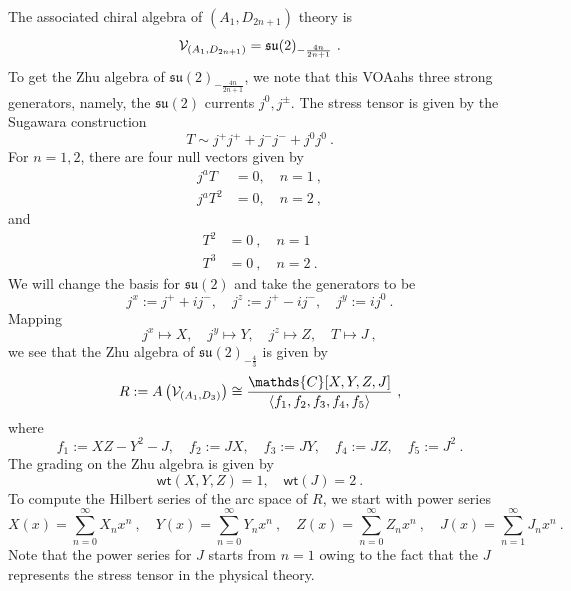 \documentclass[a4paper,10pt]{article}
\newcommand{\C}{\mathds{C}}
\newcommand{\mr}[1]{\mathsf{#1}}
\newcommand{\tsf}[1]{\textsf{#1}}
\newcommand{\mf}[1]{\mathfrak{#1}}
\def\CV {{\cal V}}
\begin{document}
The associated chiral algebra of $(A_1,D_{2n+1})$ theory is \cite{beem2014infinite,Beem:2017ooy} 
\begin{equation}
    \CV_{(A_1,D_{2n+1})}=\mf{su}(2)_{-\frac{4n}{2n+1}}~.
\end{equation}
To get the Zhu algebra of $\mf{su}(2)_{-\frac{4n}{2n+1}}$, we note that this \tsf{VOA}ahs three strong generators, namely, the $\mf{su}(2)$ currents $j^0,j^\pm$. The stress tensor is given by the Sugawara construction 
\begin{equation}
    T\sim j^+j^++j^-j^-+j^0j^0~.
\end{equation}
For $n=1,2$, there are four null vectors \cite{Beem:2017ooy} given by 
\begin{align}
j^aT&=0,\quad n=1~,
\\
j^aT^2&=0,\quad n=2~,
\end{align}
and 
\begin{align}
T^2&=0~,\quad n=1
\\
T^3&=0~,\quad n=2~.
\end{align}
We will change the basis for $\mf{su}(2)$ and take the generators to be 
\begin{equation}\label{eq:basis_change_su(2)}
    j^x:=j^++ij^-,\quad j^z:=j^+-ij^-,\quad j^y:=ij^0~.
\end{equation}
Mapping 
\begin{equation}\label{eq:var_su(2)_zhu}
    j^x\mapsto X,\quad j^y\mapsto Y,\quad j^z\mapsto Z,\quad T\mapsto J~,
\end{equation}
we see that the Zhu algebra of $\mf{su}(2)_{-\frac{4}{3}}$ is given by 
\begin{equation}
    R:=A\left(\CV_{(A_1,D_{3})}\right)\cong\frac{\C[X,Y,Z,J]}{\langle f_1,f_2,f_3,f_4,f_5\rangle}~,
\end{equation}
where 
\begin{equation}
    f_1:=XZ-Y^2-J,\quad f_2:=JX,\quad f_3:=JY,\quad f_4:=JZ,\quad f_5:=J^2~.
\end{equation}
The grading on the Zhu algebra is given by 
\begin{equation}
    \mr{wt}(X,Y,Z)=1,\quad \mr{wt}(J)=2~.
\end{equation}
To compute the Hilbert series of the arc space of $R$, we start with power series 
\begin{equation}
    X(x)=\sum_{n=0}^\infty X_nx^n~,\quad Y(x)=\sum_{n=0}^\infty Y_nx^n~,\quad Z(x)=\sum_{n=0}^\infty Z_nx^n~,\quad J(x)=\sum_{n=1}^\infty J_nx^n~.
\end{equation}
Note that the power series for $J$ starts from $n=1$ owing to the fact that the $J$ represents the stress tensor in the physical theory. 
\end{document}
